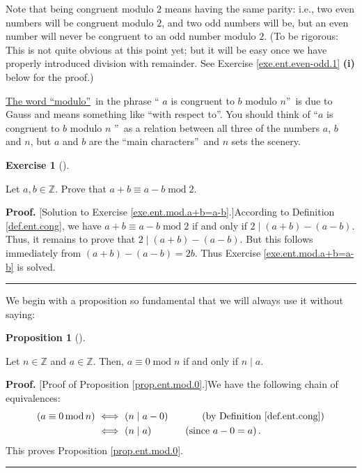 \documentclass[numbers=enddot,12pt,final,onecolumn,notitlepage]{scrartcl}%
\newcounter{exer}
\numberwithin{exer}{subsection}
\theoremstyle{definition}
\newtheorem{prop}[theo]{Proposition}
\newenvironment{proposition}[1][]
{\begin{prop}[#1]\begin{leftbar}}
{\end{leftbar}\end{prop}}
\newtheorem{exmp}[exer]{Exercise}
\newenvironment{exercise}[1][]
{\begin{exmp}[#1]\begin{leftbar}}
{\end{leftbar}\end{exmp}}
\newenvironment{fineprint}{\begin{small}}{\end{small}}
\newenvironment{proof}[1][Proof]{\noindent\textbf{#1.} }{\ \rule{0.5em}{0.5em}}
\begin{document}
Note that being congruent modulo $2$ means having the same parity: i.e., two
even numbers will be congruent modulo $2$, and two odd numbers will be, but an
even number will never be congruent to an odd number modulo $2$. (To be
rigorous: This is not quite obvious at this point yet; but it will be easy
once we have properly introduced division with remainder. See Exercise
\ref{exe.ent.even-odd.1} \textbf{(i)} below for the proof.)

\href{https://en.wikipedia.org/wiki/Modulo_(jargon)}{The word
\textquotedblleft modulo\textquotedblright}\ in the phrase \textquotedblleft%
$a$ is congruent to $b$ modulo $n$\textquotedblright\ is due to Gauss and
means something like \textquotedblleft with respect to\textquotedblright. You
should think of \textquotedblleft$a$ is congruent to $b$ modulo $n$%
\textquotedblright\ as a relation between all three of the numbers $a$, $b$
and $n$, but $a$ and $b$ are the \textquotedblleft main
characters\textquotedblright\ and $n$ sets the scenery.

\begin{exercise}
\label{exe.ent.mod.a+b=a-b}Let $a,b\in\mathbb{Z}$. Prove that $a+b\equiv
a-b\operatorname{mod}2$.
\end{exercise}

\begin{fineprint}
\begin{proof}
[Solution to Exercise \ref{exe.ent.mod.a+b=a-b}.]According to Definition
\ref{def.ent.cong}, we have $a+b\equiv a-b\operatorname{mod}2$ if and only if
$2\mid\left(  a+b\right)  -\left(  a-b\right)  $. Thus, it remains to prove
that $2\mid\left(  a+b\right)  -\left(  a-b\right)  $. But this follows
immediately from $\left(  a+b\right)  -\left(  a-b\right)  =2b$. Thus Exercise
\ref{exe.ent.mod.a+b=a-b} is solved.
\end{proof}
\end{fineprint}

We begin with a proposition so fundamental that we will always use it without saying:

\begin{proposition}
\label{prop.ent.mod.0}Let $n\in\mathbb{Z}$ and $a\in\mathbb{Z}$. Then,
$a\equiv0\operatorname{mod}n$ if and only if $n\mid a$.
\end{proposition}

\begin{proof}
[Proof of Proposition \ref{prop.ent.mod.0}.]We have the following chain of
equivalences:%
\begin{align*}
\left(  a\equiv0\operatorname{mod}n\right)  \  &  \Longleftrightarrow\ \left(
n\mid a-0\right)  \ \ \ \ \ \ \ \ \ \ \left(  \text{by Definition
\ref{def.ent.cong}}\right) \\
&  \Longleftrightarrow\ \left(  n\mid a\right)  \ \ \ \ \ \ \ \ \ \ \left(
\text{since }a-0=a\right)  .
\end{align*}
This proves Proposition \ref{prop.ent.mod.0}.
\end{proof}
\end{document}
